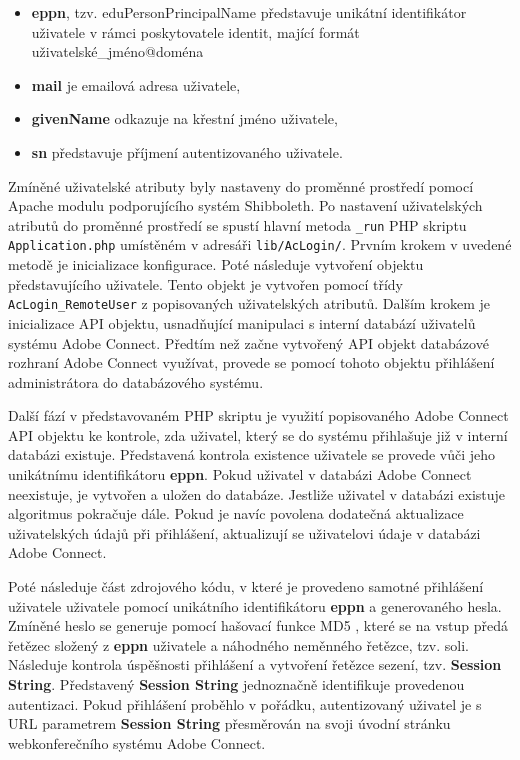 \documentclass[
  printed, %
  twoside, %
  table,   %
  nolof,     %
  nolot,     %
]{fithesis3}
\begin{document}
\begin{itemize}
    \item \textbf{eppn}, tzv. eduPersonPrincipalName představuje unikátní identifikátor uživatele v rámci poskytovatele identit,  mající formát uživatelské\_jméno@doména  
    \item \textbf{mail} je emailová adresa uživatele, 
    \item \textbf{givenName} odkazuje na křestní jméno uživatele,
    \item \textbf{sn} představuje příjmení autentizovaného uživatele.
\end{itemize}
\label{item:adobe-connect}
Zmíněné uživatelské atributy byly nastaveny do proměnné prostředí pomocí Apache modulu podporujícího systém Shibboleth. Po nastavení uživatelských atributů do proměnné prostředí se spustí hlavní metoda \texttt{\_run} PHP skriptu \texttt{Application.php} umístěném v adresáři \texttt{lib/AcLogin/}. Prvním krokem v uvedené metodě je inicializace konfigurace. Poté následuje vytvoření objektu představujícího uživatele. Tento objekt je vytvořen pomocí třídy \texttt{AcLogin\_RemoteUser} z popisovaných uživatelských atributů. Dalším krokem je inicializace API objektu, usnadňující manipulaci s interní databází uživatelů systému Adobe Connect. Předtím než začne vytvořený API objekt databázové rozhraní Adobe Connect využívat, provede se pomocí tohoto objektu přihlášení administrátora do databázového systému. \par 

Další fází v představovaném PHP skriptu je využití popisovaného Adobe Connect API objektu ke kontrole, zda uživatel, který se do systému přihlašuje již v interní databázi existuje. Představená kontrola existence uživatele se provede vůči jeho unikátnímu identifikátoru \textbf{eppn}. Pokud uživatel v databázi Adobe Connect neexistuje, je vytvořen a uložen do databáze. Jestliže uživatel v databázi existuje algoritmus pokračuje dále. Pokud je navíc povolena dodatečná aktualizace uživatelských údajů při přihlášení, aktualizují se uživatelovi údaje v databázi Adobe Connect. \par

Poté následuje část zdrojového kódu, v které je provedeno samotné přihlášení uživatele uživatele pomocí unikátního identifikátoru \textbf{eppn} a generovaného hesla. Zmíněné heslo se generuje pomocí hašovací funkce MD5 \cite{rfc1321}, které se na vstup předá řetězec složený z \textbf{eppn} uživatele a náhodného neměnného řetězce, tzv. soli. Následuje kontrola úspěšnosti přihlášení a vytvoření řetězce sezení, tzv. \textbf{Session String}. Představený \textbf{Session String} jednoznačně identifikuje provedenou autentizaci. Pokud přihlášení proběhlo v pořádku, autentizovaný uživatel je s URL parametrem \textbf{Session String} přesměrován na svoji úvodní stránku webkonferečního systému Adobe Connect.      
\end{document}
